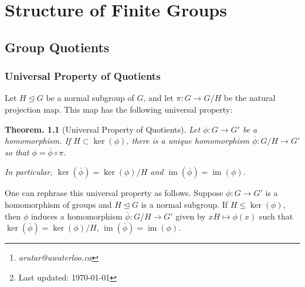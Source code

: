 \documentclass[11pt, a4paper]{memoir}
\title{\subject}
\author{Alex Rutar\thanks{\itshape arutar@uwaterloo.ca}\\ University of Waterloo}
\date{\semester\thanks{Last updated: \today}}
\theoremstyle{change}
\newtheorem{theorem}{Theorem.}[section]
\theoremstyle{plain}
\theoremstyle{nonumberplain}
\DeclareMathOperator{\im}{im}
\numberwithin{equation}{section}
\begin{document}
\hypersetup{pageanchor=false}
\maketitle
\newpage
\frontmatter
\hypersetup{pageanchor=true}
\tableofcontents*
\newpage
\mainmatter


\chapter{Structure of Finite Groups}
\section{Group Quotients}
\subsection{Universal Property of Quotients}
Let $H\trianglelefteq G$ be a normal subgroup of $G$, and let $\pi:G\to G/H$ be the natural projection map.
This map has the following universal property:
\begin{theorem}[Universal Property of Quotients]
    Let $\phi:G\to G'$ be a homomorphism.
    If $H\subset\ker(\phi)$, there is a unique homomorphism $\overline{\phi}:G/H\to G'$ so that $\phi=\overline{\phi}\circ\pi$.

    In particular, $\ker(\overline{\phi})=\ker(\phi)/H$ and $\im(\overline{\phi})=\im(\phi)$.
\end{theorem}
One can rephrase this universal property as follows.
Suppose $\phi:G\to G'$ is a homomorphism of groups and $H\trianglelefteq G$ is a normal subgroup.
If $H\leq\ker(\phi)$, then $\phi$ induces a homomorphism $\overline{\phi}:G/H\to G'$ given by $xH\mapsto\phi(x)$ such that $\ker(\overline{\phi})=\ker(\phi)/H$, $\im(\overline{\phi})=\im(\phi)$.
\end{document}
